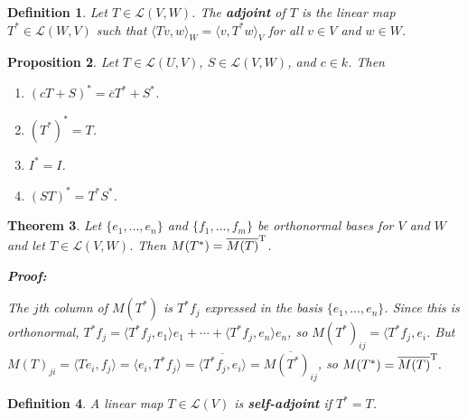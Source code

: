 \documentclass{article}
\theoremstyle{colontheorem}
\newtheorem{theorem}{Theorem}[section]
\newtheorem{proposition}[theorem]{Proposition}
\newtheorem{definition}[theorem]{Definition}
\newenvironment{Theorem}
{
	\begin{mdframed}[backgroundcolor=TheoremOrange!10]
	\begin{theorem}
}
{
	\end{theorem}
	\end{mdframed}
	
	\vspace{.15in}
}
\newenvironment{Proposition}
{
	\begin{mdframed}[backgroundcolor=PropPink!10]
	\begin{proposition}
}
{
	\end{proposition}
	\end{mdframed}
	
	\vspace{.15in}
}
\newenvironment{Def}
{
	\begin{mdframed}[backgroundcolor=DefGreen!10]
	\begin{definition}
}
{
	\end{definition}
	\end{mdframed}
	
	\vspace{.15in}
}
\newenvironment{Proof}
{
	\begin{mdframed}[backgroundcolor=ProofPurple!10]
	\textbf{Proof:}%
}
{
	\end{mdframed}
	
	\vspace{.085in}
}
\begin{document}
\begin{Def}
	
	Let $T \in \mathcal{L}(V, W)$. The \textbf{adjoint} of $T$ is the linear map $T^* \in \mathcal{L}(W, V)$ such that $\langle Tv, w \rangle_W = \langle v, T^*w \rangle_V$ for all $v \in V$ and $w \in W$.
	
\end{Def}



\begin{Proposition}
	
	Let $T \in \mathcal{L}(U, V)$, $S \in \mathcal{L}(V, W)$, and $c \in k$. Then
	
	\begin{enumerate}
		
		\item $(cT + S)^* = \overline{c} T^* + S^*$.
		\item $(T^*)^* = T$.
		\item $I^* = I$.
		\item $(ST)^* = T^* S^*$.
		
	\end{enumerate}
	
\end{Proposition}



\begin{Theorem}
	
	Let $\{e_1, ..., e_n\}$ and $\{f_1, ..., f_m\}$ be orthonormal bases for $V$ and $W$ and let $T \in \mathcal{L}(V, W)$. Then $M(T^*) = \overline{M(T)}^\textnormal{T}$.
	
	\begin{Proof}
		The $j$th column of $M(T^*)$ is $T^* f_j$ expressed in the basis $\{e_1, ..., e_n\}$. Since this is orthonormal, $T^* f_j = \langle T^* f_j, e_1 \rangle e_1 + \cdots + \langle T^* f_j, e_n \rangle e_n$, so $M(T^*)_{ij} = \langle T^* f_j, e_i$. But $M(T)_{ji} = \langle Te_i, f_j \rangle = \langle e_i, T^* f_j \rangle = \overline{\langle T^* f_j, e_i \rangle} = \overline{M(T^*)_{ij}}$, so $M(T^*) = \overline{M(T)}^\textnormal{T}.$
		
	\end{Proof}
	
\end{Theorem}



\begin{Def}
	
	A linear map $T \in \mathcal{L}(V)$ is \textbf{self-adjoint} if $T^* = T$.
	
\end{Def}
\end{document}
